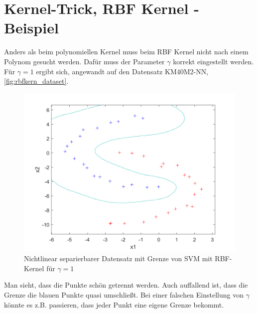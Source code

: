 \documentclass[a4paper,11pt,twoside]{scrreprt}
\begin{document}
\section{Kernel-Trick, RBF Kernel - Beispiel}\label{sec:rbfkern_bsp}
Anders als beim polynomiellen Kernel muss beim \ac{RBF} Kernel nicht nach einem Polynom gesucht werden.
Dafür muss der Parameter $\gamma$ korrekt eingestellt werden.
Für $\gamma = 1$ ergibt sich, angewandt auf den Datensatz KM40M2-NN, \autoref{fig:rbfkern_dataset}. %
\begin{figure}[H]
    \centering
    \includegraphics[width = 16cm]{../code/octave/images/sgdrbfkernel}
    \caption{Nichtlinear separierbarer Datensatz mit Grenze von \ac{SVM} mit \ac{RBF}-Kernel für $\gamma=1$}
    \label{fig:rbfkern_dataset}
\end{figure}
Man sieht, dass die Punkte schön getrennt werden.
Auch auffallend ist, dass die Grenze die blauen Punkte quasi umschließt.
Bei einer falschen Einstellung von $\gamma$ könnte es z.B. passieren, dass jeder Punkt eine eigene Grenze bekommt. %

\nocite{*}

\clearpage
{}
{}
\printbibliography[title=Weiterführende Ressourcen]
\end{document}
